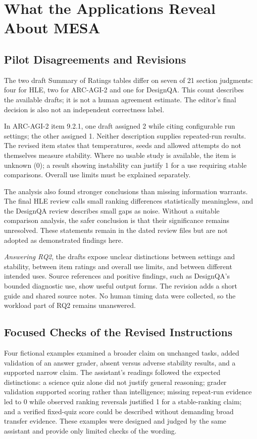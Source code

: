 \documentclass[conference]{IEEEtran}
\begin{document}
\section{What the Applications Reveal About MESA}

    \subsection{Pilot Disagreements and Revisions}

    The two draft Summary of Ratings tables differ on seven of 21 section judgments: four for HLE, two for ARC-AGI-2 and one for DesignQA. This count describes the available drafts; it is not a human agreement estimate. The editor's final decision is also not an independent correctness label.

    In ARC-AGI-2 item 9.2.1, one draft assigned 2 while citing configurable run settings; the other assigned 1. Neither description supplies repeated-run results. The revised item states that temperatures, seeds and allowed attempts do not themselves measure stability. Where no usable study is available, the item is unknown (0); a result showing instability can justify 1 for a use requiring stable comparisons. Overall use limits must be explained separately.

    The analysis also found stronger conclusions than missing information warrants. The final HLE review calls small ranking differences statistically meaningless, and the DesignQA review describes small gaps as noise. Without a suitable comparison analysis, the safer conclusion is that their significance remains unresolved. These statements remain in the dated review files but are not adopted as demonstrated findings here.

    \emph{Answering RQ2}, the drafts expose unclear distinctions between settings and stability, between item ratings and overall use limits, and between different intended uses. Source references and positive findings, such as DesignQA's bounded diagnostic use, show useful output forms. The revision adds a short guide and shared source notes. No human timing data were collected, so the workload part of RQ2 remains unanswered.

    \subsection{Focused Checks of the Revised Instructions}

    Four fictional examples examined a broader claim on unchanged tasks, added validation of an answer grader, absent versus adverse stability results, and a supported narrow claim. The assistant's readings followed the expected distinctions: a science quiz alone did not justify general reasoning; grader validation supported scoring rather than intelligence; missing repeat-run evidence led to 0 while observed ranking reversals justified 1 for a stable-ranking claim; and a verified fixed-quiz score could be described without demanding broad transfer evidence. These examples were designed and judged by the same assistant and provide only limited checks of the wording.
\end{document}
